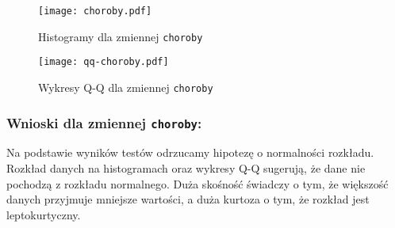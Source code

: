 \documentclass[12pt,a4paper]{article}
\begin{document}
\begin{figure}[H]
    \centering
    \texttt{[image: choroby.pdf]}
    \caption{Histogramy dla zmiennej \texttt{choroby}}
\end{figure}
\begin{figure}[H]
    \centering
    \texttt{[image: qq-choroby.pdf]}
    \caption{Wykresy Q-Q dla zmiennej \texttt{choroby}}
\end{figure}

\subsubsection*{Wnioski dla zmiennej \texttt{choroby}:}
Na podstawie wyników testów odrzucamy hipotezę o normalności rozkładu. Rozkład danych na histogramach oraz wykresy Q-Q sugerują, że dane nie pochodzą z rozkładu normalnego. Duża skośność świadczy o tym, że większość danych przyjmuje mniejsze wartości, a duża kurtoza o tym, że rozkład jest leptokurtyczny.
\end{document}
